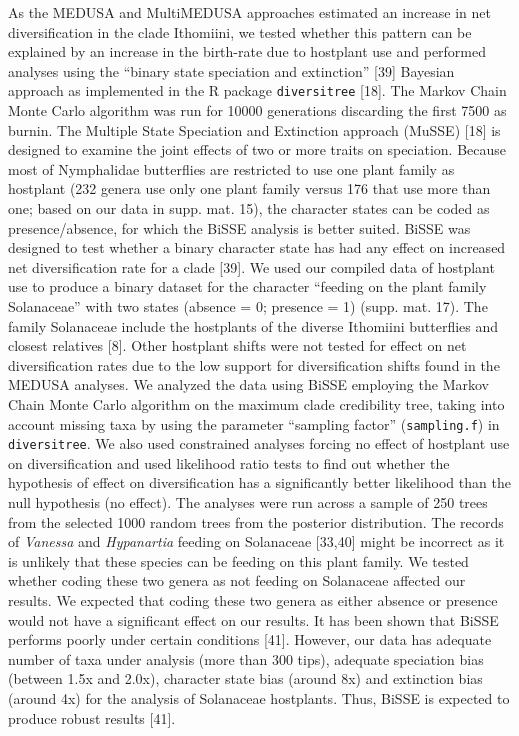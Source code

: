 \documentclass[10pt]{article}
\begin{document}
As the MEDUSA and MultiMEDUSA approaches estimated an increase in net
diversification in the clade Ithomiini, we tested whether this pattern
can be explained by an increase in the birth-rate due to hostplant use
and performed analyses using the ``binary state speciation and
extinction'' {[}39{]} Bayesian approach as implemented in the R package
\texttt{diversitree} {[}18{]}. The Markov Chain Monte Carlo algorithm
was run for 10000 generations discarding the first 7500 as burnin. The
Multiple State Speciation and Extinction approach (MuSSE) {[}18{]} is
designed to examine the joint effects of two or more traits on
speciation. Because most of Nymphalidae butterflies are restricted to
use one plant family as hostplant (232 genera use only one plant family
versus 176 that use more than one; based on our data in supp. mat. 15),
the character states can be coded as presence/absence, for which the
BiSSE analysis is better suited. BiSSE was designed to test whether a
binary character state has had any effect on increased net
diversification rate for a clade {[}39{]}. We used our compiled data of
hostplant use to produce a binary dataset for the character ``feeding on
the plant family Solanaceae'' with two states (absence = 0; presence =
1) (supp. mat. 17). The family Solanaceae include the hostplants of the
diverse Ithomiini butterflies and closest relatives {[}8{]}. Other
hostplant shifts were not tested for effect on net diversification rates
due to the low support for diversification shifts found in the MEDUSA
analyses. We analyzed the data using BiSSE employing the Markov Chain
Monte Carlo algorithm on the maximum clade credibility tree, taking into
account missing taxa by using the parameter ``sampling factor''
(\texttt{sampling.f}) in \texttt{diversitree}. We also used constrained
analyses forcing no effect of hostplant use on diversification and used
likelihood ratio tests to find out whether the hypothesis of effect on
diversification has a significantly better likelihood than the null
hypothesis (no effect). The analyses were run across a sample of 250
trees from the selected 1000 random trees from the posterior
distribution. The records of \emph{Vanessa} and \emph{Hypanartia}
feeding on Solanaceae {[}33,40{]} might be incorrect as it is unlikely
that these species can be feeding on this plant family. We tested
whether coding these two genera as not feeding on Solanaceae affected
our results. We expected that coding these two genera as either absence
or presence would not have a significant effect on our results. It has
been shown that BiSSE performs poorly under certain conditions {[}41{]}.
However, our data has adequate number of taxa under analysis (more than
300 tips), adequate speciation bias (between 1.5x and 2.0x), character
state bias (around 8x) and extinction bias (around 4x) for the analysis
of Solanaceae hostplants. Thus, BiSSE is expected to produce robust
results {[}41{]}.
\end{document}
